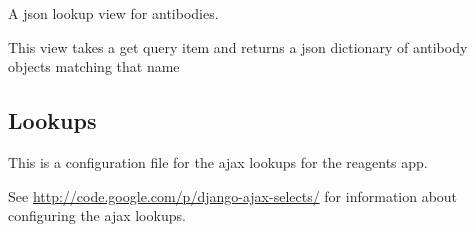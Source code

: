 \documentclass[letterpaper,10pt,english]{sphinxmanual}
\begin{document}
\begin{fulllineitems}
\label{api:experimentdb.reagents.views.antibody_lookup}
A json lookup view for antibodies.


This view takes a get query item and returns a json dictionary of antibody objects matching that name


\end{fulllineitems}


\begin{fulllineitems}
\label{api:experimentdb.reagents.views.index}
\end{fulllineitems}



\subsection{Lookups}
\label{api:id20}\label{api:module-experimentdb.reagents.lookups}
This is a configuration file for the ajax lookups for the reagents app.


See \href{http://code.google.com/p/django-ajax-selects/}{http://code.google.com/p/django-ajax-selects/} for information about configuring the ajax lookups.

\end{document}
